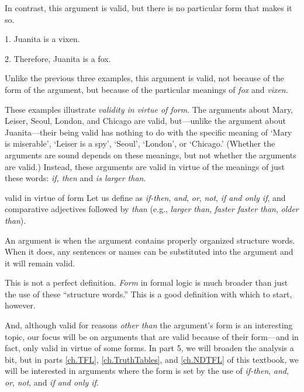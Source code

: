 In contrast, this argument is valid, but there is no particular form that makes it so.
	\begin{earg}
		\item[1.] Juanita is a vixen.
		\item[2.] Therefore, Juanita is a fox.
	\end{earg}
Unlike the previous three examples, this argument is valid, not because of the form of the argument, but because of the particular meanings of \textit{fox} and \textit{vixen}. 

These examples illustrate \emph{validity in virtue of form}. The arguments about Mary, Leiser, Seoul, London, and Chicago are valid, but---unlike the argument about Juanita---their being valid has nothing to do with the specific meaning of `Mary is miserable', `Leiser is a spy', `Seoul', `London', or `Chicago.' (Whether the arguments are sound depends on these meanings, but not whether the arguments are valid.) Instead, these arguments are valid in virtue of the meanings of just these words: \textit{if, then} and \textit{is larger than}.

\begin{factboxy}{valid in virtue of form}
Let us define  as \textit{if-then}, \textit{and}, \textit{or}, \textit{not}, \textit{if and only if}, and comparative adjectives followed by \textit{than} (e.g., \textit{larger than}, \textit{faster faster than}, \textit{older than}).

An argument is  when the argument contains properly organized structure words. When it does, any sentences or names can be substituted into the argument and it will remain valid. 
\end{factboxy}

\noindent This is not a perfect definition. \textit{Form} in formal logic is much broader than just the use of these ``structure words.'' This is a good definition with which to start, however.

And, although valid for reasons \textit{other than} the argument's form is an interesting topic, our focus will be on arguments that are valid because of their form---and in fact, only valid in virtue of some forms. In part 5, we will broaden the analysis a bit, but in parts  \ref{ch.TFL}, \ref{ch.TruthTables}, and \ref{ch.NDTFL} of this textbook, we will be interested in arguments where the form is set by the use of  \textit{if-then}, \textit{and}, \textit{or}, \textit{not}, and \textit{if and only if}. 

